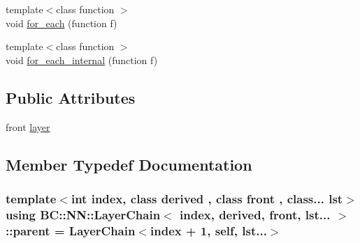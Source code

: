 \begin{DoxyCompactItemize}
\item 
{\footnotesize template$<$class function $>$ }\\void \hyperlink{structBC_1_1NN_1_1LayerChain_3_01index_00_01derived_00_01front_00_01lst_8_8_8_01_4_ad1c8e49e44bdbea6de7a87d076fe0785}{for\+\_\+each} (function f)
\item 
{\footnotesize template$<$class function $>$ }\\void \hyperlink{structBC_1_1NN_1_1LayerChain_3_01index_00_01derived_00_01front_00_01lst_8_8_8_01_4_a321662c5691e084b7eb911904efeca81}{for\+\_\+each\+\_\+internal} (function f)
\end{DoxyCompactItemize}
\subsection*{Public Attributes}
\begin{DoxyCompactItemize}
\item 
front \hyperlink{structBC_1_1NN_1_1LayerChain_3_01index_00_01derived_00_01front_00_01lst_8_8_8_01_4_a293d83d632405821a92723ecd1443cde}{layer}
\end{DoxyCompactItemize}


\subsection{Member Typedef Documentation}
\subsubsection[{\texorpdfstring{parent}{parent}}]{\setlength{\rightskip}{0pt plus 5cm}template$<$int index, class derived , class front , class... lst$>$ using {\bf B\+C\+::\+N\+N\+::\+Layer\+Chain}$<$ index, derived, front, lst... $>$\+::{\bf parent} =  {\bf Layer\+Chain}$<$index + 1, {\bf self}, lst...$>$}\hypertarget{structBC_1_1NN_1_1LayerChain_3_01index_00_01derived_00_01front_00_01lst_8_8_8_01_4_ab570a55e09679bd360529850e85b3054}{}\label{structBC_1_1NN_1_1LayerChain_3_01index_00_01derived_00_01front_00_01lst_8_8_8_01_4_ab570a55e09679bd360529850e85b3054}
